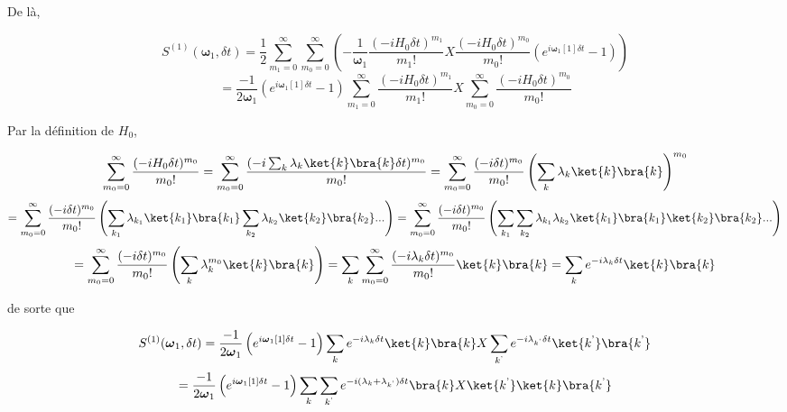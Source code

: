 De là,

\begin{equation*}
    S^{(1)}(\boldsymbol{\omega}_1, \delta t) = \frac{1}{2}\sum_{m_1 = 0}^{\infty}\sum_{m_0 = 0}^{\infty}\left(-\frac{1}{\boldsymbol{\omega}_1}\frac{(-i H_0 \delta t)^{m_1}}{m_1!}X\frac{(-iH_0 \delta t)^{m_0}}{m_0!}\left(e^{i\boldsymbol{\omega}_1[1]\delta t} - 1\right)\right)
\end{equation*}
\begin{equation*}
    = \frac{-1}{2\boldsymbol{\omega}_1}\left(e^{i\boldsymbol{\omega}_1[1]\delta t} - 1\right)\sum_{m_1 = 0}^{\infty}\frac{(-i H_0 \delta t)^{m_1}}{m_1!} X \sum_{m_0 = 0}^{\infty}\frac{(-i H_0 \delta t)^{m_0}}{m_0!}
\end{equation*}

Par la définition de $H_0$,

\begin{equation*}
    \sum_{m_0 = 0}^{\infty}\frac{(-i H_0 \delta t)^{m_0}}{m_0!} = \sum_{m_0 = 0}^{\infty}\frac{(-i \sum_{k}\lambda_k \ket{k}\bra{k} \delta t)^{m_0}}{m_0!} = \sum_{m_0 = 0}^{\infty}\frac{(-i \delta t)^{m_0}}{m_0!} \left(\sum_{k}\lambda_k \ket{k}\bra{k}\right)^{m_0}
\end{equation*}
\begin{equation*}
    = \sum_{m_0 = 0}^{\infty}\frac{(-i \delta t)^{m_0}}{m_0!} \left(\sum_{k_1}\lambda_{k_1} \ket{k_1}\bra{k_1}\sum_{k_2}\lambda_{k_2} \ket{k_2}\bra{k_2}...\right) = \sum_{m_0 = 0}^{\infty}\frac{(-i \delta t)^{m_0}}{m_0!} \left(\sum_{k_1}\sum_{k_2}\lambda_{k_1}\lambda_{k_2} \ket{k_1}\bra{k_1} \ket{k_2}\bra{k_2}...\right) 
\end{equation*}
\begin{equation*}
    = \sum_{m_0 = 0}^{\infty}\frac{(-i \delta t)^{m_0}}{m_0!} \left(\sum_{k}\lambda_k^{m_0} \ket{k}\bra{k}\right) =\sum_{k} \sum_{m_0 = 0}^{\infty}\frac{(-i \lambda_k \delta t)^{m_0}}{m_0!} \ket{k}\bra{k} = \sum_{k} e^{-i\lambda_k\delta t} \ket{k}\bra{k}
\end{equation*}

de sorte que

\begin{equation*}
    S^{(1)}(\boldsymbol{\omega}_1, \delta t) = \frac{-1}{2\boldsymbol{\omega}_1}\left(e^{i\boldsymbol{\omega}_1[1]\delta t} - 1\right)\sum_{k} e^{-i\lambda_k\delta t} \ket{k}\bra{k} X \sum_{k^\text{'}} e^{-i\lambda_{k^\text{'}}\delta t} \ket{k^\text{'}}\bra{k^\text{'}}
\end{equation*}
\begin{equation*}
    = \frac{-1}{2\boldsymbol{\omega}_1}\left(e^{i\boldsymbol{\omega}_1[1]\delta t} - 1\right)\sum_{k}\sum_{k^\text{'}} e^{-i (\lambda_k + \lambda_{k^\text{'}})\delta t}\bra{k} X\ket{k^\text{'}}\ket{k}\bra{k^\text{'}}
\end{equation*}








